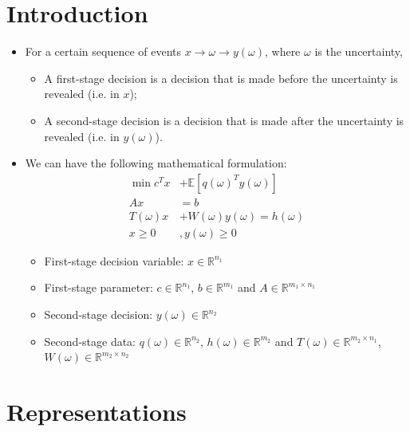 \documentclass[12pt, openany]{report}
\newcommand{\R}{\mathbb{R}}
\newcommand{\E}{\mathbb{E}}
\theoremstyle{definition}
\begin{document}
\section{Introduction}
\begin{itemize}
	\item  For a certain sequence of events $x \to \omega \to y(\omega)$, where $\omega$ is the uncertainty,
	\begin{itemize}
		\item A first-stage decision is a decision that is made before the uncertainty is revealed (i.e. in $x$);
		\item A second-stage decision is a decision that is made after the uncertainty is revealed (i.e. in $y(\omega)$).
	\end{itemize}
	\item We can have the following mathematical formulation:
	\begin{equation}\label{eq:TSSLP_formulation}
		\begin{aligned}
			\min c^T x &+ \E[q(\omega)^T y(\omega)]\\
			Ax &= b\\
			T(\omega) x &+ W(\omega)y(\omega) = h(\omega)\\
			x \geq 0&, y(\omega) \geq 0
		\end{aligned}
	\end{equation}
	\begin{itemize}
		\item First-stage decision variable: $x \in \R^{n_1}$
		\item First-stage parameter: $c \in \R^{n_1}$, $b \in \R^{m_1}$ and $A \in \R^{m_1 \times n_1}$
		\item Second-stage decision: $y(\omega) \in \R^{n_2}$
		\item Second-stage data: $q(\omega) \in \R^{n_2}$, $h(\omega) \in \R^{m_2}$ and $T(\omega) \in \R^{m_2 \times n_1}$, $W(\omega) \in \R^{m_2 \times n_2}$
	\end{itemize}
\end{itemize}
\section{Representations}
\end{document}
